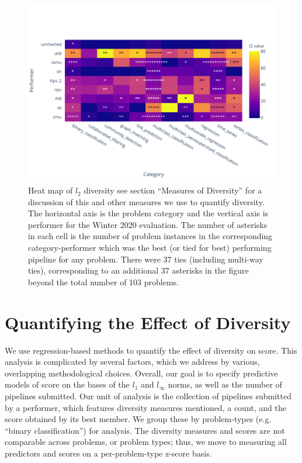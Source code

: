 \documentclass{article}
\begin{document}
\begin{figure}
\centering
\includegraphics[scale=1.3]{heatmap.pdf}
\caption{Heat map of $l_2$ diversity see section ``Measures of
  Diversity'' for a discussion of this and other measures we use to
  quantify diversity.  The horizontal axis is the problem category and
  the vertical axis is performer for the Winter 2020 evaluation.  The
  number of asterisks in each cell is the number of problem instances
  in the corresponding category-performer which was the best (or tied
  for best) performing pipeline for any problem.  There were 37 ties
  (including multi-way ties), corresponding to an additional 37
  asterisks in the figure beyond the total number of 103 problems.}
\label{fig:heatmap}
\end{figure}

\section{Quantifying the Effect of Diversity}
\label{sec:quantifying}
We use regression-based methods to quantify the effect of diversity on score. This analysis is complicated by several factors, which we address by various, overlapping methodological choices. Overall, our goal is to specify predictive models of score on the bases of the $l_1$ and $l_\infty$ norms, as well as the number of pipelines submitted. Our unit of analysis is the collection of pipelines submitted by a performer, which features diversity measures mentioned, a count, and the score obtained by its best member. We group these by problem-types (e.g. ``binary classification'') for analysis. The diversity measures and scores are not comparable across problems, or problem types; thus, we move to measuring all predictors and scores on a per-problem-type z-score basis. 
\end{document}
